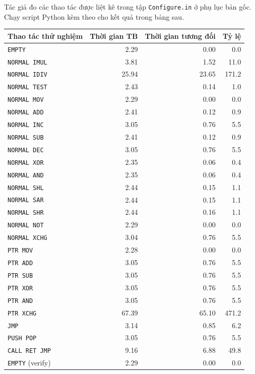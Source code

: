 \documentclass[11pt]{article}
\begin{document}
Tác giả đo các thao tác được liệt kê trong tập \texttt{Configure.in} ở phụ lục
bản gốc. Chạy script Python kèm theo cho kết quả trong bảng sau.

\begin{center}
\scriptsize
\begin{tabular}{lrrr}
\hline
Thao tác thử nghiệm & Thời gian TB & Thời gian tương đối & Tỷ lệ \\
\hline
\texttt{EMPTY} & 2.29 & 0.00 & 0.0 \\
\texttt{NORMAL IMUL} & 3.81 & 1.52 & 11.0 \\
\texttt{NORMAL IDIV} & 25.94 & 23.65 & 171.2 \\
\texttt{NORMAL TEST} & 2.43 & 0.14 & 1.0 \\
\texttt{NORMAL MOV} & 2.29 & 0.00 & 0.0 \\
\texttt{NORMAL ADD} & 2.41 & 0.12 & 0.9 \\
\texttt{NORMAL INC} & 3.05 & 0.76 & 5.5 \\
\texttt{NORMAL SUB} & 2.41 & 0.12 & 0.9 \\
\texttt{NORMAL DEC} & 3.05 & 0.76 & 5.5 \\
\texttt{NORMAL XOR} & 2.35 & 0.06 & 0.4 \\
\texttt{NORMAL AND} & 2.35 & 0.06 & 0.4 \\
\texttt{NORMAL SHL} & 2.44 & 0.15 & 1.1 \\
\texttt{NORMAL SAR} & 2.44 & 0.15 & 1.1 \\
\texttt{NORMAL SHR} & 2.44 & 0.16 & 1.1 \\
\texttt{NORMAL NOT} & 2.29 & 0.00 & 0.0 \\
\texttt{NORMAL XCHG} & 3.04 & 0.76 & 5.5 \\
\texttt{PTR MOV} & 2.28 & 0.00 & 0.0 \\
\texttt{PTR ADD} & 3.05 & 0.76 & 5.5 \\
\texttt{PTR SUB} & 3.05 & 0.76 & 5.5 \\
\texttt{PTR XOR} & 3.05 & 0.76 & 5.5 \\
\texttt{PTR AND} & 3.05 & 0.76 & 5.5 \\
\texttt{PTR XCHG} & 67.39 & 65.10 & 471.2 \\
\texttt{JMP} & 3.14 & 0.85 & 6.2 \\
\texttt{PUSH POP} & 3.05 & 0.76 & 5.5 \\
\texttt{CALL RET JMP} & 9.16 & 6.88 & 49.8 \\
\texttt{EMPTY} (verify) & 2.29 & 0.00 & 0.0 \\
\hline
\end{tabular}
\end{center}
\end{document}
